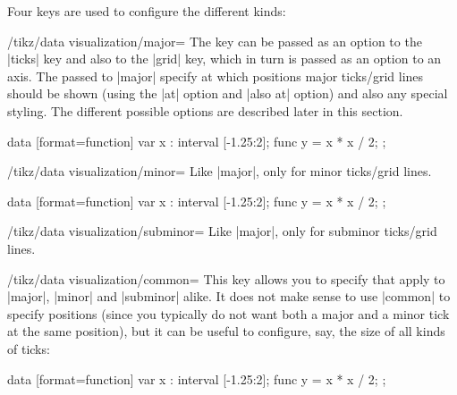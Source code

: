 Four keys are used to configure the different kinds:

\begin{key}{/tikz/data visualization/major=}
    The key can be passed as an option to the |ticks| key and also to the |grid| key, which in turn is passed as an option to an axis. The  passed to |major| specify at which positions major ticks/grid lines should be shown (using the |at| option and |also at| option) and also any special styling. The different possible options are described later in this section.
\begin{codeexample}[preamble={\usetikzlibrary{datavisualization.formats.functions}}]
\tikz \datavisualization
  [ school book axes, visualize as smooth line,
    x axis={ticks={major={at={1, 1.5, 2}}}}]
  data [format=function] {
    var x : interval [-1.25:2];
    func y = \value x * \value x / 2;
  };
\end{codeexample}
\end{key}

\begin{key}{/tikz/data visualization/minor=} Like |major|, only for minor ticks/grid lines.
\begin{codeexample}[preamble={\usetikzlibrary{datavisualization.formats.functions}}]
\tikz \datavisualization
  [ school book axes, visualize as smooth line,
    x axis={grid={minor={at={1, 1.5, 2}}}}]
  data [format=function] {
    var x : interval [-1.25:2];
    func y = \value x * \value x / 2;
  };
\end{codeexample}
\end{key}

\begin{key}{/tikz/data visualization/subminor=}
    Like |major|, only for subminor ticks/grid lines.
\end{key}

\begin{key}{/tikz/data visualization/common=}
    This key allows you to specify  that apply to |major|, |minor| and |subminor| alike. It does not make sense to use |common| to specify positions (since you typically do not want both a major and a minor tick at the same position), but it can be useful to configure, say, the size of all kinds of ticks:
\begin{codeexample}[preamble={\usetikzlibrary{datavisualization.formats.functions}}]
\tikz \datavisualization
  [ school book axes, visualize as smooth line,
    x axis={ticks={minor steps between steps, common={low=0}}} ]
  data [format=function] {
    var x : interval [-1.25:2];
    func y = \value x * \value x / 2;
  };
\end{codeexample}
\end{key}

